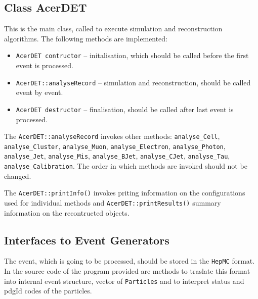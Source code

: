 \subsection{Class AcerDET}

This is the main class, called to execute simulation and
reconstruction algorithms. The following methods
are implemented:
\begin{itemize}
\item
{\tt AcerDET contructor} -- initalisation, which should be called before the first
event is processed.
\item
{\tt AcerDET::analyseRecord} -- simulation and reconstruction, should be called event
by event.
\item 
{\tt AcerDET destructor} -- finalisation, should be called after last event is
processed.
\end{itemize}

The {\tt AcerDET::analyseRecord} invokes other methods: {\tt  analyse\_Cell},
{\tt  analyse\_Cluster}, {\tt  analyse\_Muon}, {\tt  analyse\_Electron}, 
{\tt analyse\_Photon}, {\tt analyse\_Jet}, {\tt  analyse\_Mis}, {\tt  analyse\_BJet}, 
{\tt analyse\_CJet}, {\tt analyse\_Tau}, {\tt  analyse\_Calibration}.
The order in which methods are invoked should not be changed. 

The {\tt AcerDET::printInfo()} invokes priting information on the configurations used for 
individual methods and  {\tt AcerDET::printResults()} summary information on the recontructed
objects. 
    

\subsection{Interfaces to Event Generators}

The event, which is going to be processed, should be stored
in the {\tt HepMC} format. In the source code of the program
provided are methods to traslate this format into internal event
structure, vector of {\tt Particles} and to interpret status 
and pdgId codes of the particles. 

